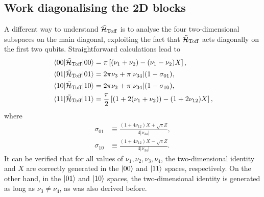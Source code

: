 \subsection{Work diagonalising the 2D blocks}
\label{subsec:GL:diagonalising_2D_blocks}
A different way to understand $\tilde{{\mathcal{H}}}_{\operatorname{Toff}}$ is to analyse the four two-dimensional subspaces on the main diagonal, exploiting the fact that $\tilde{{\mathcal{H}}}_{\operatorname{Toff}}{}$ acts diagonally on the first two qubits.
Straightforward calculations lead to
\begin{equation*}
\begin{aligned}
	\mel{00}{\tilde{{\mathcal{H}}}_{\operatorname{Toff}}}{00} &= \pi \left[(\nu_1+\nu_2)-(\nu_1-\nu_2)X\right], \\
	\mel{01}{\tilde{{\mathcal{H}}}_{\operatorname{Toff}}}{01} &= 2\pi\nu_3 + \pi\lvert\nu_{34}\rvert(1 - \sigma_{01}), \\
	\mel{10}{\tilde{{\mathcal{H}}}_{\operatorname{Toff}}}{10} &= 2\pi\nu_3 + \pi\lvert\nu_{34}\rvert(1 - \sigma_{10}), \\
	\mel{11}{\tilde{{\mathcal{H}}}_{\operatorname{Toff}}}{11} &= \frac{\pi}{2}\left[
		(1+2(\nu_1+\nu_2))-(1+2\nu_{12})X
	\right], \\
\end{aligned}
\end{equation*}
where
\begin{equation}
\begin{aligned}
	\sigma_{01}&\equiv\frac{(1+4\nu_{12})X + \sqrt{c}Z}{4\lvert\nu_{34}\rvert}, \\
	\sigma_{10}&\equiv\frac{(1+4\nu_{12})X - \sqrt{c}Z}{4\lvert\nu_{34}\rvert}.
\end{aligned}
\end{equation}
It can be verified that for all values of $\nu_1, \nu_2, \nu_3, \nu_4$, the two-dimensional identity and $X$ are correctly generated in the $\ket{00}$ and $\ket{11}$ spaces, respectively.
On the other hand, in the $\ket{01}$ and $\ket{10}$ spaces, the two-dimensional identity is generated as long as $\nu_3\neq\nu_4$, as was also derived before.

